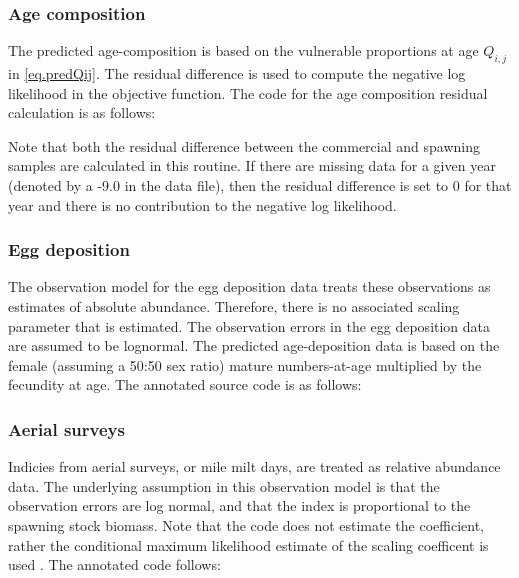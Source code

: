 \documentclass[12pt,letterpaper]{article}
\begin{document}
    \subsubsection{Age composition} %
    \label{ssub:age_composition}
    The predicted age-composition is based on the vulnerable proportions at age $Q_{i,j}$ in \eqref{eq.predQij}.  The residual difference is used to compute the negative log likelihood in the objective function.  The code for the age composition residual calculation is as follows:
    
    Note that both the residual difference between the commercial and spawning samples are calculated in this routine.  If there are missing data for a given year (denoted by a -9.0 in the data file), then the residual difference is set to 0 for that year and there is no contribution to the negative log likelihood.

    \subsubsection{Egg deposition} %
    \label{ssub:egg_deposition}
    The observation model for the egg deposition data treats these observations as estimates of absolute abundance.  Therefore, there is no associated scaling parameter that is estimated. The observation errors in the egg deposition data are assumed to be lognormal.  The predicted age-deposition data is based on the female (assuming a 50:50 sex ratio) mature numbers-at-age multiplied by the fecundity at age.  The annotated source code is as follows:
    


    \subsubsection{Aerial surveys} %
    \label{ssub:aerial_surveys}
    Indicies from aerial surveys, or mile milt days, are treated as relative abundance data.  The underlying assumption in this observation model is that the observation errors are log normal, and that the index is proportional to the spawning stock biomass.  Note that the code does not estimate the coefficient, rather the conditional maximum likelihood estimate of the scaling coefficent is used \citep[see][for a full explanation]{walters1994calculation}.  The annotated code follows:
     
\end{document}
